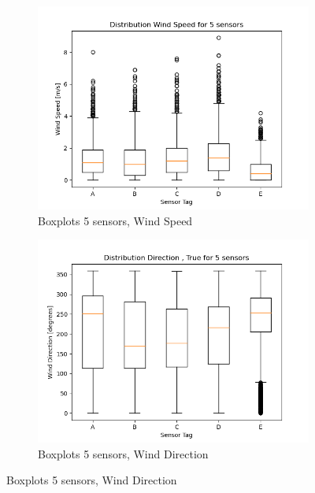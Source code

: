 \documentclass{report}
\begin{document}
	
	\begin{figure}[H]
		\centering
		\begin{subfigure}[b]{0.7\linewidth}
			\includegraphics[width=\linewidth]{GEO1001_hw01_images/GEO1001_hw01_A1_box_wind.png}
			\caption{Boxplots 5 sensors, Wind Speed}
			\label{fig:boxwind}
		\end{subfigure}
	
		\begin{subfigure}[b]{0.7\linewidth}
			\includegraphics[width=\linewidth]{GEO1001_hw01_images/GEO1001_hw01_A1_box_direction.png}
			\caption{Boxplots 5 sensors, Wind Direction}
			\label{fig:boxdir}
		\end{subfigure}
		

\end{figure}
\end{document}
